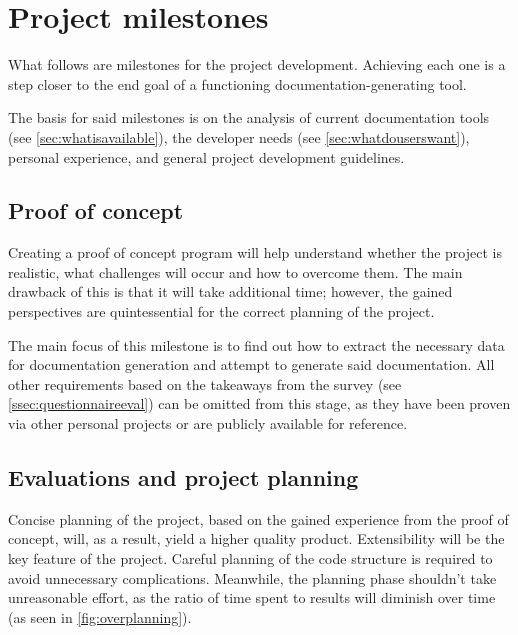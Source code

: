\chapter{Project milestones}

What follows are milestones for the project development.
Achieving each one is a step closer to the end goal of a functioning documentation-generating tool.

The basis for said milestones is on the analysis of current documentation tools (see \ref{sec:whatisavailable}), the developer needs (see \ref{sec:whatdouserswant}), personal experience, and general project development guidelines.

\section{Proof of concept}

Creating a proof of concept program will help understand whether the project is realistic, what challenges will occur and how to overcome them.
The main drawback of this is that it will take additional time; however, the gained perspectives are quintessential for the correct planning of the project.

The main focus of this milestone is to find out how to extract the necessary data for documentation generation and attempt to generate said documentation.
All other requirements based on the takeaways from the survey (see \ref{ssec:questionnaireeval}) can be omitted from this stage, as they have been proven via other personal projects or are publicly available for reference.

\section{Evaluations and project planning}

Concise planning of the project, based on the gained experience from the proof of concept, will, as a result, yield a higher quality product.
Extensibility will be the key feature of the project. Careful planning of the code structure is required to avoid unnecessary complications.
Meanwhile, the planning phase shouldn't take unreasonable effort, as the ratio of time spent to results will diminish over time (as seen in \ref{fig:overplanning}). \cite{ruparelia_stop_2016}

